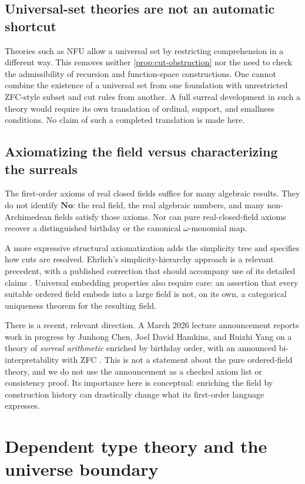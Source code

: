 \documentclass[11pt,letterpaper]{article}
\theoremstyle{definition}
\theoremstyle{remark}
\newcommand{\No}{\mathbf{No}}
\numberwithin{equation}{section}
\begin{document}
\subsection{Universal-set theories are not an automatic shortcut}
Theories such as NFU allow a universal set by restricting comprehension in a different way. This removes neither \cref{prop:cut-obstruction} nor the need to check the admissibility of recursion and function-space constructions. One cannot combine the existence of a universal set from one foundation with unrestricted ZFC-style subset and cut rules from another. A full surreal development in such a theory would require its own translation of ordinal, support, and smallness conditions. No claim of such a completed translation is made here.

\subsection{Axiomatizing the field versus characterizing the surreals}
The first-order axioms of real closed fields suffice for many algebraic results. They do not identify \(\No\): the real field, the real algebraic numbers, and many non-Archimedean fields satisfy those axioms. Nor can pure real-closed-field axioms recover a distinguished birthday or the canonical \(\omega\)-monomial map.

A more expressive structural axiomatization adds the simplicity tree and specifies how cuts are resolved. Ehrlich's simplicity-hierarchy approach is a relevant precedent, with a published correction that should accompany use of its detailed claims \cite{Ehrlich,EhrlichCorrection}. Universal embedding properties also require care: an assertion that every suitable ordered field embeds into a large field is not, on its own, a categorical uniqueness theorem for the resulting field.

There is a recent, relevant direction. A March 2026 lecture announcement reports work in progress by Junhong Chen, Joel David Hamkins, and Ruizhi Yang on a theory of \emph{surreal arithmetic} enriched by birthday order, with an announced bi-interpretability with ZFC \cite{Hamkins2026}. This is not a statement about the pure ordered-field theory, and we do not use the announcement as a checked axiom list or consistency proof. Its importance here is conceptual: enriching the field by construction history can drastically change what its first-order language expresses.

\section{Dependent type theory and the universe boundary}\label{sec:types}
\end{document}
